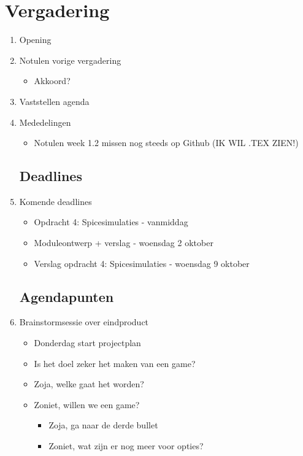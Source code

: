 \documentclass{article}
\begin{document}
\section*{Vergadering}
\begin{enumerate}
	
	\subsection*{Vooraf}
	\item Opening
	\item Notulen vorige vergadering
	\begin{itemize}
		\item Akkoord?
	\end{itemize}
	\item Vaststellen agenda
	\item Mededelingen
	\begin{itemize}
		\item Notulen week 1.2 missen nog steeds op Github (IK WIL .TEX ZIEN!)
	\end{itemize}

	\subsection*{Deadlines}
	\item Komende deadlines
	\begin{itemize}
		\item Opdracht 4: Spicesimulaties - vanmiddag
		\item Moduleontwerp + verslag - woensdag 2 oktober
		\item Verslag opdracht 4: Spicesimulaties - woensdag 9 oktober
	\end{itemize}

	\subsection*{Agendapunten}
	\item Brainstormsessie over eindproduct
	\begin{itemize}
		\item Donderdag start projectplan
		\item Is het doel zeker het maken van een game?
		\item Zoja, welke gaat het worden?
		\item Zoniet, willen we een game?
		\begin{itemize}
			\item Zoja, ga naar de derde bullet
			\item Zoniet, wat zijn er nog meer voor opties?
		\end{itemize}
	\end{itemize}	


\end{enumerate}
\end{document}
